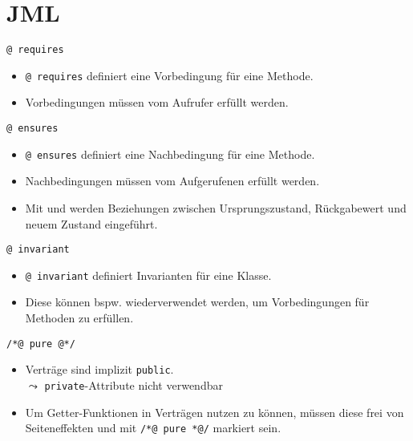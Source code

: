 \documentclass{beamer}
\begin{document}
\section{JML}

\begin{frame}{\texttt{@ requires}}

	\begin{itemize}
		\item \texttt{@ requires} definiert eine Vorbedingung für eine Methode.
		\item Vorbedingungen müssen vom Aufrufer erfüllt werden.
	\end{itemize}
\end{frame}

\begin{frame}{\texttt{@ ensures}}

	\begin{itemize}
		\item \texttt{@ ensures} definiert eine Nachbedingung für eine Methode.
		\item Nachbedingungen müssen vom Aufgerufenen erfüllt werden.
        \item Mit \texttt{\string\old} und \texttt{\string\result} werden Beziehungen zwischen Ursprungszustand, Rückgabewert und neuem Zustand eingeführt.
	\end{itemize}
\end{frame}

\begin{frame}{\texttt{@ invariant}}

	\begin{itemize}
		\item \texttt{@ invariant} definiert Invarianten für eine Klasse.
		\item Diese können bspw. wiederverwendet werden, um Vorbedingungen für Methoden zu erfüllen.
	\end{itemize}
\end{frame}

\begin{frame}{\texttt{/*@ pure @*/}}

	\begin{itemize}
		\item Verträge sind implizit \texttt{public}.\\
		$\leadsto$ \texttt{private}-Attribute nicht verwendbar
		\item Um Getter-Funktionen in Verträgen nutzen zu können, müssen diese frei von Seiteneffekten und mit \texttt{/*@ pure *@/} markiert sein.
	\end{itemize}
\end{frame}
\end{document}
